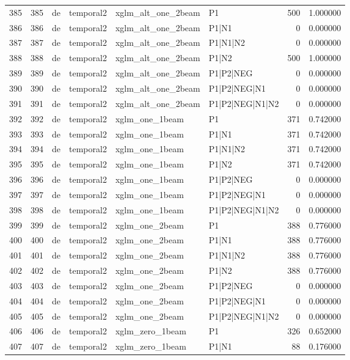 \begin{tabular}{lrllllrr}
385 & 385 & de & temporal2 & xglm_alt_one_2beam & P1 & 500 & 1.000000 \\
386 & 386 & de & temporal2 & xglm_alt_one_2beam & P1|N1 & 0 & 0.000000 \\
387 & 387 & de & temporal2 & xglm_alt_one_2beam & P1|N1|N2 & 0 & 0.000000 \\
388 & 388 & de & temporal2 & xglm_alt_one_2beam & P1|N2 & 500 & 1.000000 \\
389 & 389 & de & temporal2 & xglm_alt_one_2beam & P1|P2|NEG & 0 & 0.000000 \\
390 & 390 & de & temporal2 & xglm_alt_one_2beam & P1|P2|NEG|N1 & 0 & 0.000000 \\
391 & 391 & de & temporal2 & xglm_alt_one_2beam & P1|P2|NEG|N1|N2 & 0 & 0.000000 \\
392 & 392 & de & temporal2 & xglm_one_1beam & P1 & 371 & 0.742000 \\
393 & 393 & de & temporal2 & xglm_one_1beam & P1|N1 & 371 & 0.742000 \\
394 & 394 & de & temporal2 & xglm_one_1beam & P1|N1|N2 & 371 & 0.742000 \\
395 & 395 & de & temporal2 & xglm_one_1beam & P1|N2 & 371 & 0.742000 \\
396 & 396 & de & temporal2 & xglm_one_1beam & P1|P2|NEG & 0 & 0.000000 \\
397 & 397 & de & temporal2 & xglm_one_1beam & P1|P2|NEG|N1 & 0 & 0.000000 \\
398 & 398 & de & temporal2 & xglm_one_1beam & P1|P2|NEG|N1|N2 & 0 & 0.000000 \\
399 & 399 & de & temporal2 & xglm_one_2beam & P1 & 388 & 0.776000 \\
400 & 400 & de & temporal2 & xglm_one_2beam & P1|N1 & 388 & 0.776000 \\
401 & 401 & de & temporal2 & xglm_one_2beam & P1|N1|N2 & 388 & 0.776000 \\
402 & 402 & de & temporal2 & xglm_one_2beam & P1|N2 & 388 & 0.776000 \\
403 & 403 & de & temporal2 & xglm_one_2beam & P1|P2|NEG & 0 & 0.000000 \\
404 & 404 & de & temporal2 & xglm_one_2beam & P1|P2|NEG|N1 & 0 & 0.000000 \\
405 & 405 & de & temporal2 & xglm_one_2beam & P1|P2|NEG|N1|N2 & 0 & 0.000000 \\
406 & 406 & de & temporal2 & xglm_zero_1beam & P1 & 326 & 0.652000 \\
407 & 407 & de & temporal2 & xglm_zero_1beam & P1|N1 & 88 & 0.176000 \\

\end{tabular}

